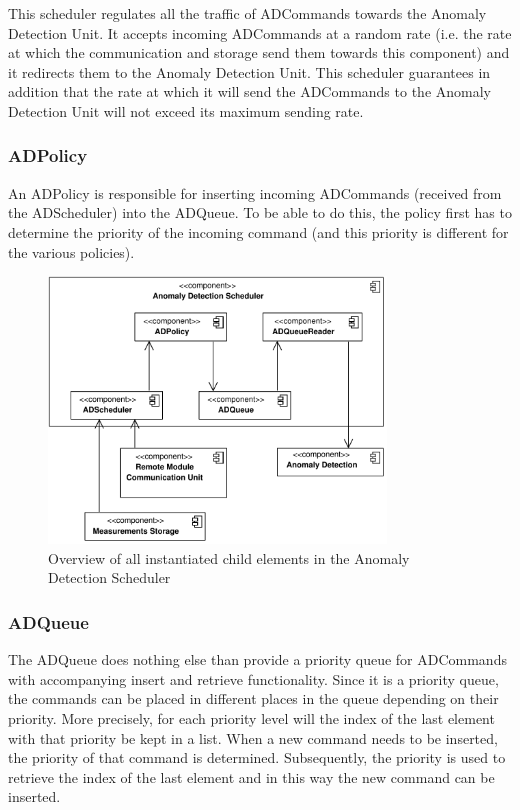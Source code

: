 \npar This scheduler regulates all the traffic of ADCommands towards the
Anomaly Detection Unit. It accepts incoming ADCommands at a random rate (i.e.
the rate at which the communication and storage send them towards this
component) and it redirects them to the Anomaly Detection Unit. This
scheduler guarantees in addition that the rate at which it will send the
ADCommands to the Anomaly Detection Unit will not exceed its maximum sending
rate.

\subsubsection{ADPolicy}

\npar An ADPolicy is responsible for inserting incoming ADCommands (received
from the ADScheduler) into the ADQueue. To be able to do this, the policy first
has to determine the priority of the incoming command (and this priority is
different for the various policies).

\begin{figure}[H]
	\begin{centering}
		\includegraphics[width=0.8\textwidth]{figs/add-it5-elements.pdf}
		\caption{Overview of all instantiated child elements in the Anomaly
		Detection Scheduler}
		\label{fig:it5/elements}
	\end{centering}
\end{figure}

\subsubsection{ADQueue}

\npar The ADQueue does nothing else than provide a priority queue for
ADCommands with accompanying insert and retrieve functionality. Since
it is a priority queue, the commands can be placed in different places in the
queue depending on their priority. More precisely, for each priority level will
the index of the last element with that priority be kept in a list. When a new
command needs to be inserted, the priority of that command is determined.
Subsequently, the priority is used to retrieve the index of the last element and
in this way the new command can be inserted.

